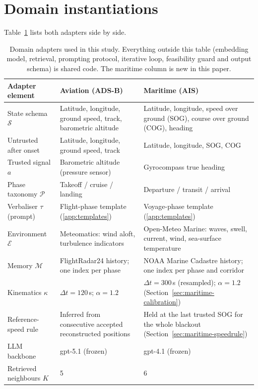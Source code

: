 \section{Domain instantiations}
\label{sec:instantiation}

Table~\ref{tab:adapters} lists both adapters side by side.

\begin{table}[t]
\centering
\caption{Domain adapters used in this study. Everything outside this table
(embedding model, retrieval, prompting protocol, iterative loop, feasibility
guard and output schema) is shared code. The maritime column is new in this
paper.}
\label{tab:adapters}
\footnotesize
\begin{tabular}{p{3.0cm}p{4.0cm}p{4.0cm}}
\toprule
Adapter element & Aviation (ADS-B) & Maritime (AIS) \\
\midrule
State schema $\mathcal{S}$ & Latitude, longitude, ground speed, track, barometric altitude & Latitude, longitude, speed over ground (SOG), course over ground (COG), heading \\
Untrusted after onset & Latitude, longitude, ground speed, track & Latitude, longitude, SOG, COG \\
Trusted signal $a$ & Barometric altitude (pressure sensor) & Gyrocompass true heading \\
Phase taxonomy $\mathcal{P}$ & Takeoff / cruise / landing & Departure / transit / arrival \\
Verbaliser $\tau$ (prompt) & Flight-phase template (\ref{app:templates}) & Voyage-phase template (\ref{app:templates}) \\
Environment $\mathcal{E}$ & Meteomatics: wind aloft, turbulence indicators & Open-Meteo Marine: waves, swell, current, wind, sea-surface temperature \\
Memory $\mathcal{M}$ & FlightRadar24 history; one index per phase & NOAA Marine Cadastre history; one index per phase and corridor \\
Kinematics $\kappa$ & $\Delta t = 120$\,s; $\alpha = 1.2$ & $\Delta t = 300$\,s (resampled); $\alpha = 1.2$ (Section~\ref{sec:maritime-calibration}) \\
Reference-speed rule & Inferred from consecutive accepted reconstructed positions & Held at the last trusted SOG for the whole blackout (Section~\ref{sec:maritime-speedrule}) \\
LLM backbone & gpt-5.1 (frozen) & gpt-4.1 (frozen) \\
Retrieved neighbours $K$ & 5 & 6 \\
\bottomrule
\end{tabular}
\end{table}

